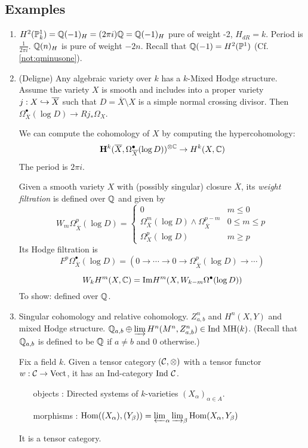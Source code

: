 \subsection{Examples}
\begin{enumerate}

\item $H^2(\mathbb{P}^1_k) = \mathbb{Q}(-1)_H = (2\pi i) \mathbb{Q} = \mathbb{Q}(-1)_H$ pure of weight -2, $H_{dR} = k$. Period is $\frac{1}{2\pi i}$. $\mathbb{Q}(n)_H$ is pure of weight $-2n$. Recall that $\mathbb{Q}(-1) = H^2(\mathbb{P}^1)$ (Cf. \ref{not:qminusone}).

\item (Deligne) Any algebraic variety over $k$ has a $k$-Mixed Hodge structure. Assume the variety $X$ is smooth and includes into a proper variety $j : X \hookrightarrow \overline{X}$ such that $D = \overline{X} \setminus X$ is a simple normal crossing divisor. Then $\Omega^{\bullet}_{\overline{X}}(\log D) \to Rj_* \Omega_X$.

We can compute the cohomology of $X$ by computing the hypercohomology:
\[
\mathbf{H}^k(\overline{X}, \Omega^{\bullet}_{\overline{X}}(\log D))^{\otimes \mathbb{C}} \to H^k(X, \mathbb{C})
\]
The period is $2\pi i$.
\begin{defn}
Given a smooth variety $X$ with (possibly singular) closure $\overline{X}$, its \emph{weight filtration} is defined over $\mathbb{Q}$ and given by
\[
W_m \Omega_{\overline{X}}^p(\log D) = \left\{ \begin{array}{ll}
0 & m \leq 0 \\
\Omega_{\overline{X}}^m(\log D) \wedge \Omega_{\overline{X}}^{p-m} & 0 \leq m \leq p \\
\Omega_X^p(\log D) & m \geq p
\end{array} \right.
\]
Its Hodge filtration is
\[
F^p \Omega_{\overline{X}}^{\bullet}(\log D) = \left( 0 \to \cdots \to 0 \to \Omega^p_{\overline{X}}(\log D) \to \cdots \right)
\]
\end{defn}
\[
W_k H^m(X, \mathbb{C}) = \mathrm{Im} H^m(X, W_{k-m} \Omega^{\bullet}(\log D))
\]
To show: defined over $\mathbb{Q}$.

\item Singular cohomology and relative cohomology. $Z^n_{a,b}$ and $H^n(X,Y)$ and mixed Hodge structure. $\mathbb{Q}_{a,b} \oplus \varinjlim H^n(M^n, Z^n_{a,b}) \in \mathrm{Ind~}\mathrm{MH}(k)$. (Recall that $\mathbb{Q}_{a,b}$ is defined to be $\mathbb{Q}$ if $a \neq b$ and $0$ otherwise.)

\begin{defn}
Fix a field $k$. Given a tensor category $(\mathcal{C}, \otimes)$ with a tensor functor $w : \mathcal{C} \to \mathrm{Vect}$, it has an Ind-category $\mathrm{Ind~} \mathcal{C}$.
\begin{itemize}
\item[objects]: Directed systems of $k$-varieties $(X_{\alpha})_{\alpha \in A}$.
\item[morphisms]: $\mathrm{Hom}((X_{\alpha}), (Y_{\beta})) = \varprojlim_{\alpha} \varinjlim_{\beta} \mathrm{Hom}(X_{\alpha}, Y_{\beta})$
\end{itemize}
It is a tensor category.
\end{defn}


\end{enumerate}

